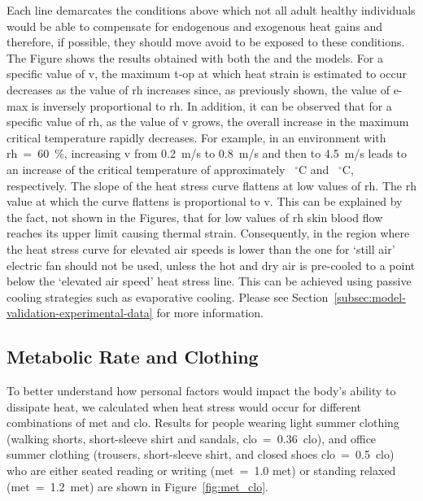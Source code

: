 Each line demarcates the conditions above which not all adult healthy individuals would be able to compensate for endogenous and exogenous heat gains and therefore, if possible, they should move avoid to be exposed to these conditions.
The Figure shows the results obtained with both the  and the  models.
For a specific value of \ac{v}, the maximum \ac{t-op} at which heat strain is estimated to occur decreases as the value of \ac{rh} increases since, as previously shown, the value of \ac{e-max} is inversely proportional to \ac{rh}.
In addition, it can be observed that for a specific value of \ac{rh}, as the value of \ac{v} grows, the overall increase in the maximum critical temperature rapidly decreases.
For example, in an environment with \ac{rh}~=~60~\%, increasing \ac{v} from 0.2~m/s to 0.8~m/s and then to 4.5~m/s leads to an increase of the critical temperature of approximately ~$^{\circ}$C and ~$^{\circ}$C, respectively.
The slope of the heat stress curve flattens at low values of \ac{rh}.
The \ac{rh} value at which the curve flattens is proportional to \ac{v}.
This can be explained by the fact, not shown in the Figures, that for low values of \ac{rh} skin blood flow reaches its upper limit causing thermal strain.
Consequently, in the region where the heat stress curve for elevated air speeds is lower than the one for `still air' electric fan should not be used, unless the hot and dry air is pre-cooled to a point below the `elevated air speed' heat stress line.
This can be achieved using passive cooling strategies such as evaporative cooling.
Please see Section~\ref{subsec:model-validation-experimental-data} for more information.


\subsection{Metabolic Rate and Clothing}\label{subsec:met-clo}

To better understand how personal factors would impact the body's ability to dissipate heat, we calculated when heat stress would occur for different combinations of \ac{met} and \ac{clo}.
Results for people wearing light summer clothing (walking shorts, short-sleeve shirt and sandals, \acs{clo}~=~0.36~clo), and office summer clothing (trousers, short-sleeve shirt, and closed shoes \acs{clo}~=~0.5~clo) who are either seated reading or writing (\ac{met}~=~1.0 met) or standing relaxed (\ac{met}~=~1.2~met) are shown in Figure~\ref{fig:met_clo}.

